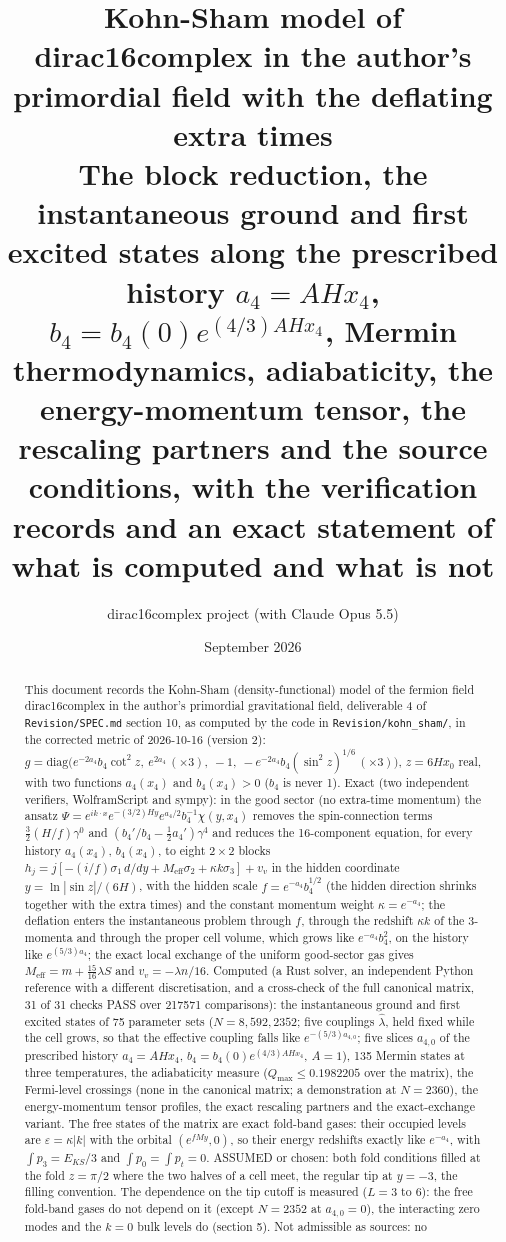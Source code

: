 \documentclass[11pt]{article}
\title{Kohn-Sham model of dirac16complex in the author's primordial field with the deflating extra times\\[0.5em]\large The block reduction, the instantaneous ground and first excited states along the prescribed history $a_4 = AHx_4$, $b_4 = b_4(0)e^{(4/3)AHx_4}$, Mermin thermodynamics, adiabaticity, the energy-momentum tensor, the rescaling partners and the source conditions, with the verification records and an exact statement of what is computed and what is not}
\author{dirac16complex project (with Claude Opus 5.5)}
\date{September 2026}
\begin{document}
\maketitle
\tableofcontents
\newpage
\begin{abstract}
This document records the Kohn-Sham (density-functional) model of the fermion field dirac16complex in the author's primordial gravitational field, deliverable 4 of \texttt{Revision\allowbreak{}/SPEC.md} section 10, as computed by the code in \texttt{Revision\allowbreak{}/kohn\_sh\allowbreak{}am/}, in the corrected metric of 2026-10-16 (version 2): $g = \mathrm{diag}\big(e^{-2a_4}b_4\cot^2 z,\ e^{2a_4}\,(\times3),\ -1,\ -e^{-2a_4}b_4(\sin^2 z)^{1/6}\,(\times3)\big)$, $z = 6Hx_0$ real, with two functions $a_4(x_4)$ and $b_4(x_4) > 0$ ($b_4$ is never 1). Exact (two independent verifiers, WolframScript and sympy): in the good sector (no extra-time momentum) the ansatz $\Psi = e^{ik\cdot x}e^{-(3/2)Hy}e^{a_4/2}b_4^{-1}\chi(y,x_4)$ removes the spin-connection terms $\tfrac32(H/f)\gamma^0$ and $(b_4'/b_4 - \tfrac12a_4')\gamma^4$ and reduces the 16-component equation, for every history $a_4(x_4)$, $b_4(x_4)$, to eight $2 \times 2$ blocks $h_j = j[-(i/f)\sigma_1\,d/dy + M_{\mathrm{eff}}\sigma_2 + \kappa k\sigma_3] + v_v$ in the hidden coordinate $y = \ln|\sin z|/(6H)$, with the hidden scale $f = e^{-a_4}b_4^{1/2}$ (the hidden direction shrinks together with the extra times) and the constant momentum weight $\kappa = e^{-a_4}$; the deflation enters the instantaneous problem through $f$, through the redshift $\kappa k$ of the 3-momenta and through the proper cell volume, which grows like $e^{-a_4}b_4^2$, on the history like $e^{(5/3)a_4}$; the exact local exchange of the uniform good-sector gas gives $M_{\mathrm{eff}} = m + \frac{15}{16}\lambda S$ and $v_v = -\lambda n/16$. Computed (a Rust solver, an independent Python reference with a different discretisation, and a cross-check of the full canonical matrix, 31 of 31 checks PASS over 217571 comparisons): the instantaneous ground and first excited states of 75 parameter sets ($N = 8, 592, 2352$; five couplings $\hat\lambda$, held fixed while the cell grows, so that the effective coupling falls like $e^{-(5/3)a_{4,0}}$; five slices $a_{4,0}$ of the prescribed history $a_4 = AHx_4$, $b_4 = b_4(0)e^{(4/3)AHx_4}$, $A = 1$), 135 Mermin states at three temperatures, the adiabaticity measure ($Q_{\max} \leq 0.1982205$ over the matrix), the Fermi-level crossings (none in the canonical matrix; a demonstration at $N = 2360$), the energy-momentum tensor profiles, the exact rescaling partners and the exact-exchange variant. The free states of the matrix are exact fold-band gases: their occupied levels are $\varepsilon = \kappa|k|$ with the orbital $(e^{fMy}, 0)$, so their energy redshifts exactly like $e^{-a_4}$, with $\int p_3 = E_{KS}/3$ and $\int p_0 = \int p_t = 0$. ASSUMED or chosen: both fold conditions filled at the fold $z = \pi/2$ where the two halves of a cell meet, the regular tip at $y = -3$, the filling convention. The dependence on the tip cutoff is measured ($L = 3$ to $6$): the free fold-band gases do not depend on it (except $N = 2352$ at $a_{4,0} = 0$), the interacting zero modes and the $k = 0$ bulk levels do (section 5). Not admissible as sources: no 
\end{abstract}
\end{document}
